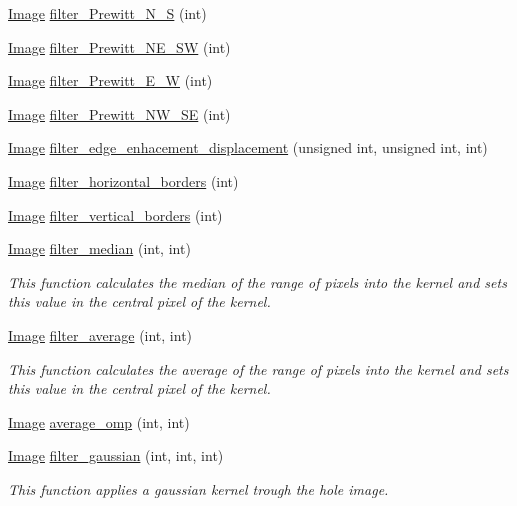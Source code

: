 \begin{DoxyCompactItemize}
\hyperlink{class_image}{Image} \hyperlink{class_image_a931b36f6843f103be624d1f58150ab63}{filter\-\_\-\-Prewitt\-\_\-\-N\-\_\-\-S} (int)
\item 
\hyperlink{class_image}{Image} \hyperlink{class_image_adfefe21b9272e6ded5ba7939d7dbe99c}{filter\-\_\-\-Prewitt\-\_\-\-N\-E\-\_\-\-S\-W} (int)
\item 
\hyperlink{class_image}{Image} \hyperlink{class_image_ac9a433b59be54fea12aa1397defd6c81}{filter\-\_\-\-Prewitt\-\_\-\-E\-\_\-\-W} (int)
\item 
\hyperlink{class_image}{Image} \hyperlink{class_image_ab33257cb397927a0445527d41a3b6dfa}{filter\-\_\-\-Prewitt\-\_\-\-N\-W\-\_\-\-S\-E} (int)
\item 
\hyperlink{class_image}{Image} \hyperlink{class_image_aa5e19816018edced13326f1d58d30f4c}{filter\-\_\-edge\-\_\-enhacement\-\_\-displacement} (unsigned int, unsigned int, int)
\item 
\hyperlink{class_image}{Image} \hyperlink{class_image_ad6baefede32227602d896966e44aed4e}{filter\-\_\-horizontal\-\_\-borders} (int)
\item 
\hyperlink{class_image}{Image} \hyperlink{class_image_a1a755f73ec71ad095f47e9222ee2c9d1}{filter\-\_\-vertical\-\_\-borders} (int)
\item 
\hyperlink{class_image}{Image} \hyperlink{class_image_aad6fa435024cf4f1635b8769325f389f}{filter\-\_\-median} (int, int)
\begin{DoxyCompactList}\small\item\em This function calculates the median of the range of pixels into the kernel and sets this value in the central pixel of the kernel. \end{DoxyCompactList}\item 
\hyperlink{class_image}{Image} \hyperlink{class_image_a7d67ea957e3525bcc60ca436fe0d8862}{filter\-\_\-average} (int, int)
\begin{DoxyCompactList}\small\item\em This function calculates the average of the range of pixels into the kernel and sets this value in the central pixel of the kernel. \end{DoxyCompactList}\item 
\hyperlink{class_image}{Image} \hyperlink{class_image_a606ec46d5e2e47ff49e7793f42eace08}{average\-\_\-omp} (int, int)
\item 
\hyperlink{class_image}{Image} \hyperlink{class_image_ae8b435684bdd6f715bfcd31517ddca0a}{filter\-\_\-gaussian} (int, int, int)
\begin{DoxyCompactList}\small\item\em This function applies a gaussian kernel trough the hole image. \end{DoxyCompactList}\item 

\end{DoxyCompactItemize}
